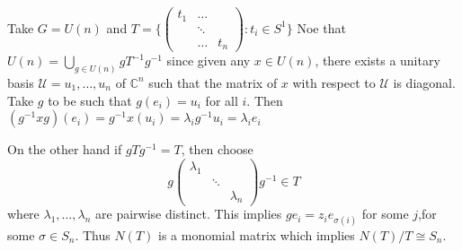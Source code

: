 \documentclass[11pt,a4paper]{scrarticle}
\theoremstyle{definition}
\theoremstyle{greenbox}
\newcommand{\C}{\mathbb{C}}
\begin{document}
 \begin{example}
    Take $ G = U(n) $ and $ T = \biggl\{ \begin{pmatrix} t_{1}&  \hdots &   \\
        & \ddots & \\
    & \hdots & t_{n} \end{pmatrix} : t_{i} \in S^{1} \biggr\} $ Noe that $ U(n) = \bigcup_{g \in U(n)}gT^{-1}g^{-1} $ since given any $ x \in U(n) $, there exists a unitary basis $ \mathcal{U} = u_{1}, \dots, u_{n} $ of $ \C^{n} $ such that the matrix of $ x $ with respect to $ \mathcal{U} $ is diagonal. Take $ g $ to be such that $ g(e_{i}) = u_{i} $ for all $ i $. Then $ (g^{-1}xg)(e_{i}) = g^{-1}x(u_{i}) = \lambda_{i}g^{-1}u_{i}  = \lambda_{i}e_{i}$ 

    On the other hand if $ gTg^{-1}=T $, then choose 
    \[ g \begin{pmatrix}
        \lambda_{1} & & \\
        & \ddots & \\
        & & \lambda_{n}
    \end{pmatrix}g^{-1} \in T \]
    where $ \lambda_{1}, \dots, \lambda_{n} $ are pairwise distinct. This implies $ ge_{i} = z_{i}e_{\sigma(i)} $ for some $ j $,for some $ \sigma \in S_{n} $. Thus $ N(T) $ is a monomial matrix which implies $ N(T) /T \cong S_{n} $. 
 \end{example}
\end{document}
